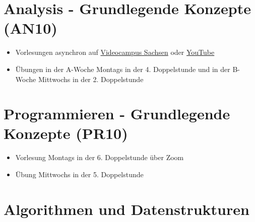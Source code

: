 \documentclass[a4paper,deutsch]{article}
\begin{document}
\section{Analysis - Grundlegende Konzepte (AN10)}
\begin{itemize}
\item Vorlesungen asynchron auf \href{https://videocampus.sachsen.de/album/view/aid/75}{Videocampus Sachsen} oder \href{https://www.youtube.com/playlist?list=PL_KzTEQSuCExpKKzITYo_CG95qr94sZqS}{YouTube}
\item Übungen in der A-Woche Montags in der 4. Doppelstunde und in der B-Woche Mittwochs in der 2. Doppelstunde
\end{itemize}

\section{Programmieren - Grundlegende Konzepte (PR10)}
\begin{itemize}
\item Vorlesung Montags in der 6. Doppelstunde über Zoom
\item Übung Mittwochs in der 5. Doppelstunde
\end{itemize}

\section{Algorithmen und Datenstrukturen}
\end{document}
